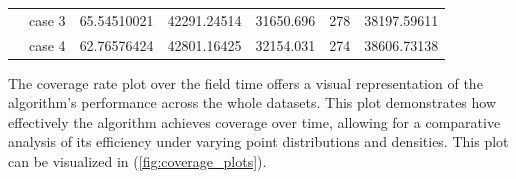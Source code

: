 \begin{table}[]
\begin{tabular}{cllllll}
    \rowcolor[HTML]{FFFFC7} 
    \cellcolor[HTML]{FFFFC7}                                                                                               & case 3                  & 65.54510021                                                                            & 42291.24514                                                                               & 31650.696                                                                           & 278                                                                        & 38197.59611                                                                                \\ \cline{2-7} 
    \rowcolor[HTML]{FFFFC7} 
    \multirow{-4}{*}{\cellcolor[HTML]{FFFFC7}10000}                                                                        & case 4                  & 62.76576424                                                                            & 42801.16425                                                                               & 32154.031                                                                           & 274                                                                        & 38606.73138                                                                                \\ \hline
    \end{tabular}
    \end{table}



\vspace{3mm} 


The coverage rate plot over the field time offers a visual representation of the algorithm's performance across the whole datasets. This plot demonstrates how effectively the algorithm achieves coverage over time, allowing for a comparative analysis of its efficiency under varying point distributions and densities. This plot can be visualized in (\autoref{fig:coverage_plots}).   


